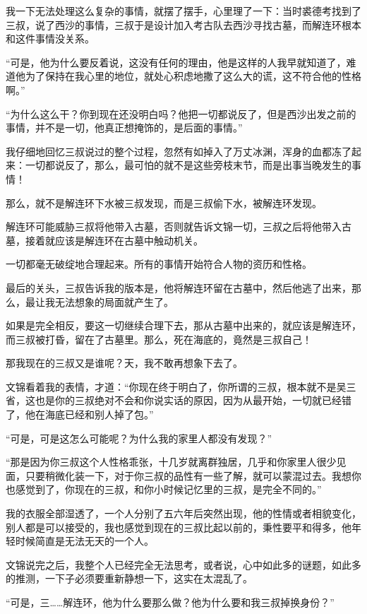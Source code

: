 我一下无法处理这么复杂的事情，就摆了摆手，心里理了一下：当时裘德考找到了三叔，说了西沙的事情，三叔于是设计加入考古队去西沙寻找古墓，而解连环根本和这件事情没关系。

“可是，他为什么要反着说，这没有任何的理由，他是这样的人我早就知道了，难道他为了保持在我心里的地位，就处心积虑地撒了这么大的谎，这不符合他的性格啊。”

“为什么这么干？你到现在还没明白吗？他把一切都说反了，但是西沙出发之前的事情，并不是一切，他真正想掩饰的，是后面的事情。”

我仔细地回忆三叔说过的整个过程，忽然有如掉入了万丈冰渊，浑身的血都冻了起来：一切都说反了，那么，最可怕的就不是这些旁枝末节，而是出事当晚发生的事情！

那么，就不是解连环下水被三叔发现，而是三叔偷下水，被解连环发现。

解连环可能威胁三叔将他带入古墓，否则就告诉文锦一切，三叔之后将他带入古墓，接着就应该是解连环在古墓中触动机关。

一切都毫无破绽地合理起来。所有的事情开始符合人物的资历和性格。

最后的关头，三叔告诉我的版本是，他将解连环留在古墓中，然后他逃了出来，那么，最让我无法想象的局面就产生了。

如果是完全相反，要这一切继续合理下去，那从古墓中出来的，就应该是解连环，而三叔被打昏，留在了古墓里。那么，死在海底的，竟然是三叔自己！

那我现在的三叔又是谁呢？天，我不敢再想象下去了。

文锦看着我的表情，才道：“你现在终于明白了，你所谓的三叔，根本就不是吴三省，这也是你的三叔绝对不会和你说实话的原因，因为从最开始，一切就已经错了，他在海底已经和别人掉了包。”

“可是，可是这怎么可能呢？为什么我的家里人都没有发现？”

“那是因为你三叔这个人性格乖张，十几岁就离群独居，几乎和你家里人很少见面，只要稍微化装一下，对于你三叔的品性有一些了解，就可以蒙混过去。我想你也感觉到了，你现在的三叔，和你小时候记忆里的三叔，是完全不同的。”

我的衣服全部湿透了，一个人分别了五六年后突然出现，他的性情或者相貌变化，别人都是可以接受的，我也感觉到现在的三叔比起以前的，秉性要平和得多，他年轻时候简直是无法无天的一个人。

文锦说完之后，我整个人已经完全无法思考，或者说，心中如此多的谜题，如此多的推测，一下子必须要重新静想一下，这实在太混乱了。

“可是，三……解连环，他为什么要那么做？他为什么要和我三叔掉换身份？”

